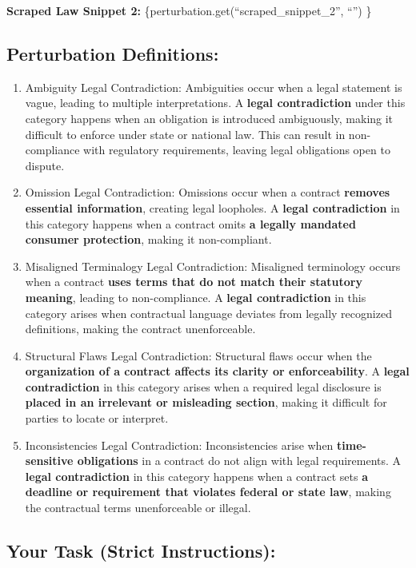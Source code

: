 \documentclass[11pt]{article}
\begin{document}
\begin{tcolorbox}[breakable,colback=lightestgray,colframe=black,title=\textbf{Legal LLM Validation Prompt}]
\textbf{Scraped Law Snippet 2:} \{perturbation.get(``scraped\_snippet\_2'', ``'') \}

\subsection*{\textbf{Perturbation Definitions:}}
\begin{enumerate}
    \item Ambiguity Legal Contradiction: Ambiguities occur when a legal statement is vague, leading to multiple interpretations. A \textbf{legal contradiction} under this category happens when an obligation is introduced ambiguously, making it difficult to enforce under state or national law. This can result in non-compliance with regulatory requirements, leaving legal obligations open to dispute.
    \item Omission Legal Contradiction: Omissions occur when a contract \textbf{removes essential information}, creating legal loopholes. A \textbf{legal contradiction} in this category happens when a contract omits \textbf{a legally mandated consumer protection}, making it non-compliant.
    \item Misaligned Terminalogy Legal Contradiction: Misaligned terminology occurs when a contract \textbf{uses terms that do not match their statutory meaning}, leading to non-compliance. A \textbf{legal contradiction} in this category arises when contractual language deviates from legally recognized definitions, making the contract unenforceable.
    \item Structural Flaws Legal Contradiction: Structural flaws occur when the \textbf{organization of a contract affects its clarity or enforceability}. A \textbf{legal contradiction} in this category arises when a required legal disclosure is \textbf{placed in an irrelevant or misleading section}, making it difficult for parties to locate or interpret.
    \item Inconsistencies Legal Contradiction: Inconsistencies arise when \textbf{time-sensitive obligations} in a contract do not align with legal requirements. A \textbf{legal contradiction} in this category happens when a contract sets \textbf{a deadline or requirement that violates federal or state law}, making the contractual terms unenforceable or illegal.
\end{enumerate}

\subsection*{\textbf{Your Task (Strict Instructions):}}


\end{tcolorbox}
\end{document}

